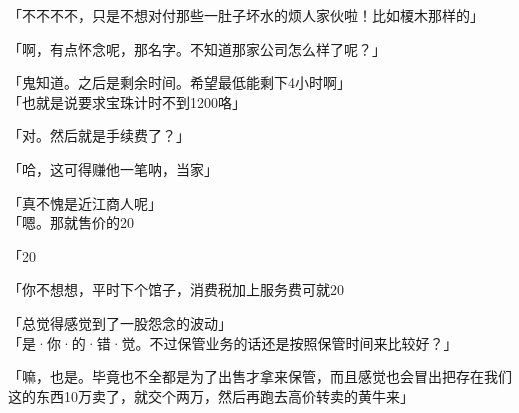 「不不不不，只是不想对付那些一肚子坏水的烦人家伙啦！比如榎木那样的」

「啊，有点怀念呢，那名字。不知道那家公司怎么样了呢？」

「鬼知道。之后是剩余时间。希望最低能剩下4小时啊」\\

「也就是说要求宝珠计时不到1200咯」

「对。然后就是手续费了？」

「哈，这可得赚他一笔呐，当家」

「真不愧是近江商人呢」\\

「嗯。那就售价的20%

「20%

「你不想想，平时下个馆子，消费税加上服务费可就20%

「总觉得感觉到了一股怨念的波动」\\

「是·你·的·错·觉。不过保管业务的话还是按照保管时间来比较好？」

「嘛，也是。毕竟也不全都是为了出售才拿来保管，而且感觉也会冒出把存在我们这的东西10万卖了，就交个两万，然后再跑去高价转卖的黄牛来」

